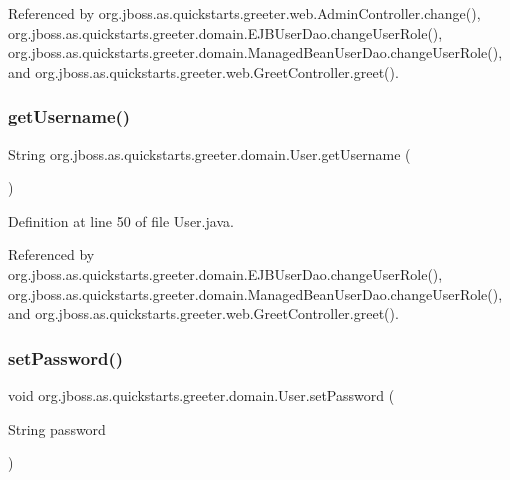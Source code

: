 Referenced by org.\+jboss.\+as.\+quickstarts.\+greeter.\+web.\+Admin\+Controller.\+change(), org.\+jboss.\+as.\+quickstarts.\+greeter.\+domain.\+E\+J\+B\+User\+Dao.\+change\+User\+Role(), org.\+jboss.\+as.\+quickstarts.\+greeter.\+domain.\+Managed\+Bean\+User\+Dao.\+change\+User\+Role(), and org.\+jboss.\+as.\+quickstarts.\+greeter.\+web.\+Greet\+Controller.\+greet().

\mbox{\label{classorg_1_1jboss_1_1as_1_1quickstarts_1_1greeter_1_1domain_1_1_user_acdf5aa9d6873f0796d2710b8f299bbbe}} 
\subsubsection{\texorpdfstring{get\+Username()}{getUsername()}}
{\footnotesize\ttfamily String org.\+jboss.\+as.\+quickstarts.\+greeter.\+domain.\+User.\+get\+Username (\begin{DoxyParamCaption}{ }\end{DoxyParamCaption})}



Definition at line 50 of file User.\+java.



Referenced by org.\+jboss.\+as.\+quickstarts.\+greeter.\+domain.\+E\+J\+B\+User\+Dao.\+change\+User\+Role(), org.\+jboss.\+as.\+quickstarts.\+greeter.\+domain.\+Managed\+Bean\+User\+Dao.\+change\+User\+Role(), and org.\+jboss.\+as.\+quickstarts.\+greeter.\+web.\+Greet\+Controller.\+greet().

\mbox{\label{classorg_1_1jboss_1_1as_1_1quickstarts_1_1greeter_1_1domain_1_1_user_afce559d24a08d9583f2a178217d7f8b6}} 
\subsubsection{\texorpdfstring{set\+Password()}{setPassword()}}
{\footnotesize\ttfamily void org.\+jboss.\+as.\+quickstarts.\+greeter.\+domain.\+User.\+set\+Password (\begin{DoxyParamCaption}\item[{String}]{password }\end{DoxyParamCaption})}



